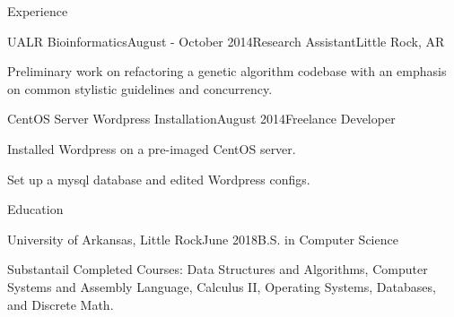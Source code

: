 \documentclass{resume} %
\begin{document}
\begin{rSection}{Experience}
\begin{rSubsection}{UALR Bioinformatics}{August - October 2014}{Research Assistant}{Little Rock, AR}
	\item Preliminary work on refactoring a genetic algorithm codebase with an emphasis on common stylistic guidelines and concurrency.
\end{rSubsection}

\begin{rSubsection}{CentOS Server Wordpress Installation}{August 2014}{Freelance Developer}{}

	\item Installed Wordpress on a pre-imaged CentOS server.
	\item Set up a mysql database and edited Wordpress configs.
\end{rSubsection}

%

%

\end{rSection}


\begin{rSection}{Education}

\begin{rSubsection}{University of Arkansas, Little Rock}{June 2018}{B.S. in Computer Science}

	\item Substantail Completed Courses: Data Structures and Algorithms, Computer Systems and Assembly Language, Calculus II, Operating Systems, Databases, and Discrete Math.
\end{rSubsection}

\end{rSection}
\end{document}
